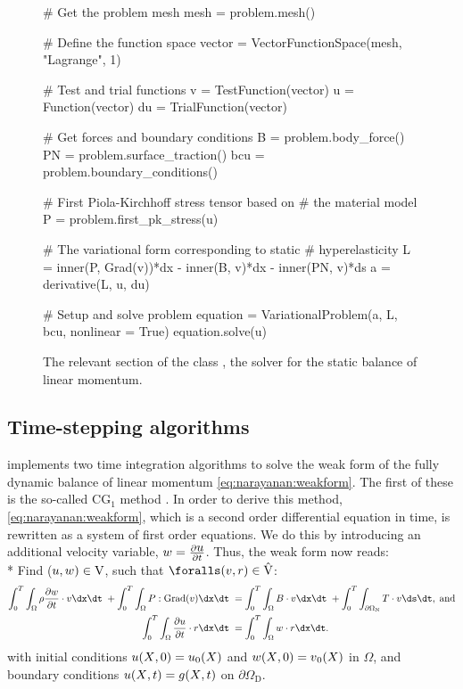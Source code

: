 \begin{figure}
\begin{python}
# Get the problem mesh
mesh = problem.mesh()

# Define the function space
vector = VectorFunctionSpace(mesh, "Lagrange", 1)

# Test and trial functions
v = TestFunction(vector)
u = Function(vector)
du = TrialFunction(vector)

# Get forces and boundary conditions
B = problem.body_force()
PN = problem.surface_traction()
bcu = problem.boundary_conditions()

# First Piola-Kirchhoff stress tensor based on
# the material model
P = problem.first_pk_stress(u)

# The variational form corresponding to static
# hyperelasticity
L = inner(P, Grad(v))*dx - inner(B, v)*dx - inner(PN, v)*ds
a = derivative(L, u, du)

# Setup and solve problem
equation = VariationalProblem(a, L, bcu,
                              nonlinear = True)
equation.solve(u)
\end{python}
\caption{The relevant section of the class
, the solver for the static balance of
linear momentum.}
\label{code:narayanan:staticmomentumsolver}
\end{figure}

\subsection{Time-stepping algorithms}

\twist{} implements two time integration algorithms to solve the weak
form of the fully dynamic balance of linear momentum
\eqref{eq:narayanan:weakform}. The first of these is the
so-called CG$_{1}$ method \citep{ErikssonEstepHansboEtAl1996}. In order
to derive this method, \eqref{eq:narayanan:weakform}, which is
a second order differential equation in time, is rewritten as a system
of first order equations. We do this by introducing an additional
velocity variable, $\mbox{$ w$} = \frac{\partial \mbox{$ u$}}{\partial t}$. Thus, the
weak form now reads: \\*
Find ($\mbox{$ u$}, \mbox{$ w$}) \in \mathrm{V}$, such that $\foralls (\bv,
\br) \in \hat{\mathrm{V}}$:
\begin{equation}
  \begin{split}
    \int_{0}^{T} \int_{\Omega} \rho \frac{\partial \bw}{\partial t}
    \cdot \bv \dx \dt\; + \int_{0}^{T} \int_{\Omega}
    \bP:\mathrm{Grad}(\bv) \dx \dt\;
    &= \int_{0}^{T} \int_{\Omega} \bB \cdot \bv \dx \dt\; +
    \int_{0}^{T} \int_{\partial\Omega_{\mathrm{N}}} \bT \cdot \bv \ds
    \dt, \; \mathrm{and}\\
    \int_{0}^{T} \int_{\Omega} \frac{\partial \bu}{\partial t} \cdot
    \br \dx \dt\;
    &= \int_{0}^{T} \int_{\Omega} \bw \cdot \br \dx \dt.
  \end{split}
\label{eq:narayanan:cg1weakform}
\end{equation}
with initial conditions $\mbox{$ u$}(\mbox{$ X$}, 0) = \mbox{$ u$}_{0}(\mbox{$ X$})$ and $w(\mbox{$ X$}, 0)
= \mbox{$ v$}_{0}(\mbox{$ X$})$ in $\Omega$, and boundary conditions $\mbox{$ u$}(\mbox{$ X$}, t) =
\mbox{$ g$}(\mbox{$ X$}, t)$ on $\partial\Omega_{\mathrm{D}}$.

